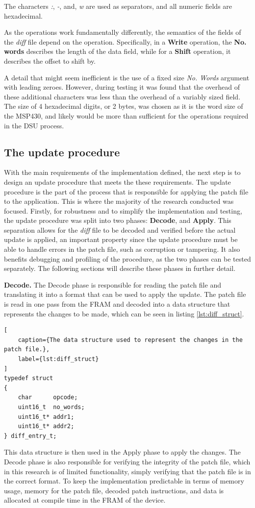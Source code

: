 \noindent The characters \textit{:}, \textit{-}, and, \textit{w} are used as separators, and all numeric fields are hexadecimal.

As the operations work fundamentally differently, the semantics of the fields of the \textit{diff} file depend on the operation. Specifically, in a \textbf{Write} operation, the \textbf{No. words} describes the length of the data field, while for a \textbf{Shift} operation, it describes the offset to shift by.

A detail that might seem inefficient is the use of a fixed size \textit{No. Words} argument with leading zeroes. However, during testing it was found that the overhead of these additional characters was less than the overhead of a variably sized field. The size of 4 hexadecimal digits, or 2 bytes, was chosen as it is the word size of the MSP430, and likely would be more than sufficient for the operations required in the DSU process. 

\subsection{The update procedure}\label{sec:updateprocedure}
With the main requirements of the implementation defined, the next step is to design an update procedure that meets the these requirements. The update procedure is the part of the process that is responsible for applying the patch file to the application. This is where the majority of the research conducted was focused. Firstly, for robustness and to simplify the implementation and testing, the update procedure was split into two phases: \textbf{Decode}, and \textbf{Apply}. This separation allows for the \textit{diff} file to be decoded and verified before the actual update is applied, an important property since the update procedure must be able to handle errors in the patch file, such as corruption or tampering. It also benefits debugging and profiling of the procedure, as the two phases can be tested separately. The following sections will describe these phases in further detail. 

\textbf{Decode.}
The Decode phase is responsible for reading the patch file and translating it into a format that can be used to apply the update. The patch file is read in one pass from the FRAM and decoded into a data structure that represents the changes to be made, which can be seen in listing \ref{lst:diff_struct}. 
\begin{lstlisting}[
    caption={The data structure used to represent the changes in the patch file.},
    label={lst:diff_struct}
]
typedef struct  
{
    char      opcode;
    uint16_t  no_words;
    uint16_t* addr1;
    uint16_t* addr2;
} diff_entry_t;
\end{lstlisting}
This data structure is then used in the Apply phase to apply the changes. The Decode phase is also responsible for verifying the integrity of the patch file, which in this research is of limited functionality, simply verifying that the patch file is in the correct format. To keep the implementation predictable in terms of memory usage, memory for the patch file, decoded patch instructions, and data is allocated at compile time in the FRAM of the device.

